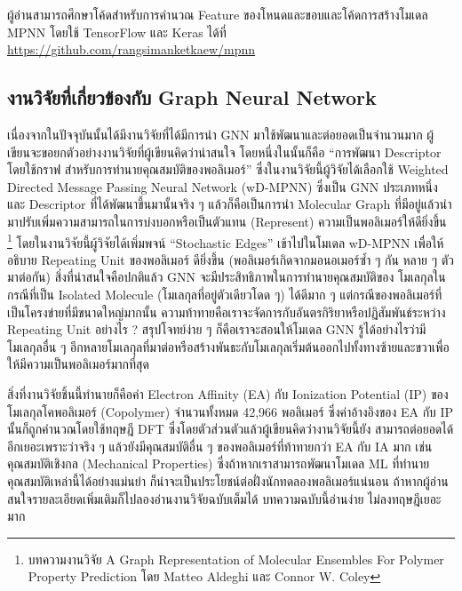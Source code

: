ผู้อ่านสามารถศึกษาโค้ดสำหรับการคำนวณ Feature ของโหนดและขอบและโค้ดการสร้างโมเดล MPNN โดยใช้ TensorFlow และ Keras ได้ที่
\url{https://github.com/rangsimanketkaew/mpnn}

\subsection{งานวิจัยที่เกี่ยวข้องกับ Graph Neural Network}
\label{ssec:gnn_papers}

เนื่องจากในปัจจุบันนั้นได้มีงานวิจัยที่ได้มีการนำ GNN มาใช้พัฒนาและต่อยอดเป็นจำนวนมาก ผู้เขียนจะขอยกตัวอย่างงานวิจัยที่ผู้เขียนคิดว่าน่าสนใจ 
โดยหนึ่งในนั้นก็คือ \enquote{การพัฒนา Descriptor โดยใช้กราฟ สำหรับการทำนายคุณสมบัติของพอลิเมอร์}\autocite{aldeghi2022} 
ซึ่งในงานวิจัยนี้ผู้วิจัยได้เลือกใช้ Weighted Directed Message Passing Neural Network (wD-MPNN) ซึ่งเป็น GNN ประเภทหนึ่ง และ 
Descriptor ที่ได้พัฒนาขึ้นมานั้นจริง ๆ แล้วก็คือเป็นการนำ Molecular Graph ที่มีอยู่แล้วนำมาปรับเพิ่มความสามารถในการบ่งบอกหรือเป็นตัวแทน 
(Represent) ความเป็นพอลิเมอร์ให้ดียิ่งขึ้น%
\footnote{บทความงานวิจัย A Graph Representation of Molecular Ensembles For Polymer Property Prediction โดย Matteo 
Aldeghi และ Connor W. Coley} 
โดยในงานวิจัยนี้ผู้วิจัยได้เพิ่มพจน์ \enquote{Stochastic Edges} เข้าไปในโมเดล wD-MPNN เพื่อให้อธิบาย Repeating Unit ของพอลิเมอร์%
ดียิ่งขึ้น (พอลิเมอร์เกิดจากมอนอเมอร์ซ้ำ ๆ กัน หลาย ๆ ตัวมาต่อกัน) สิ่งที่น่าสนใจคือปกติแล้ว GNN จะมีประสิทธิภาพในการทำนายคุณสมบัติของ%
โมเลกุลในกรณีที่เป็น Isolated Molecule (โมเลกุลที่อยู่ตัวเดียวโดด ๆ) ได้ดีมาก ๆ แต่กรณีของพอลิเมอร์ที่เป็นโครงข่ายที่มีขนาดใหญ่มากนั้น 
ความท้าทายคือเราจะจัดการกับอันตรกิริยาหรือปฏิสัมพันธ์ระหว่าง Repeating Unit อย่างไร ? สรุปโจทย์ง่าย ๆ ก็คือเราจะสอนให้โมเดล GNN 
รู้ได้อย่างไรว่ามีโมเลกุลอื่น ๆ อีกหลายโมเลกุลที่มาต่อหรือสร้างพันธะกับโมเลกุลเริ่มต้นออกไปทั้งทางซ้ายและขวาเพื่อให้มีความเป็นพอลิเมอร์มากที่สุด 

สิ่งที่งานวิจัยชิ้นนี้ทำนายก็คือค่า Electron Affinity (EA) กับ Ionization Potential (IP) ของโมเลกุลโคพอลิเมอร์ (Copolymer) 
จำนวนทั้งหมด 42,966 พอลิเมอร์ ซึ่งค่าอ้างอิงของ EA กับ IP นั้นก็ถูกคำนวณโดยใช้ทฤษฎี DFT ซึ่งโดยตัวส่วนตัวแล้วผู้เขียนคิดว่างานวิจัยนี้ยัง%
สามารถต่อยอดได้อีกเยอะเพราะว่าจริง ๆ แล้วยังมีคุณสมบัติอื่น ๆ ของพอลิเมอร์ที่ท้าทายกว่า EA กับ IA มาก เช่น คุณสมบัติเชิงกล (Mechanical 
Properties) ซึ่งถ้าหากเราสามารถพัฒนาโมเดล ML ที่ทำนายคุณสมบัติเหล่านี้ได้อย่างแม่นยำ ก็น่าจะเป็นประโยชน์ต่อฝั่งนักทดลองพอลิเมอร์แน่นอน
ถ้าหากผู้อ่านสนใจรายละเอียดเพิ่มเติมก็ไปลองอ่านงานวิจัยฉบับเต็มได้ บทความฉบับนี้อ่านง่าย ไม่ลงทฤษฎีเยอะมาก

